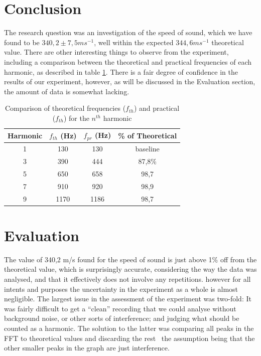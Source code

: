 \documentclass{article}
\begin{document}
\pagebreak
\section*{Conclusion}
The research question was an investigation of the speed of sound, which we have found to be $340,2 \pm 7,5 ms^{-1}$, well within the expected $344,6 ms^{-1}$ theoretical value. There are other interesting things to observe from the experiment, including a comparison between the theoretical and practical frequencies of each harmonic, as described in table \ref{table:TheoreticalXPractical}. There is a fair degree of confidence in the results of our experiment, however, as will be discussed in the Evaluation section, the amount of data is somewhat lacking.
\begin{table}[h!]
	\caption{Comparison of theoretical frequencies ($f_{th}$) and practical ($f_{th}$) for the $n^{th}$ harmonic}
	\label{table:TheoreticalXPractical}
	\begin{tabular}{|c c c c|}
		\hline
		Harmonic & $f_{th}$ (Hz) & $f_{pr}$ (Hz) & \% of Theoretical \\
		\hline
		1 & 130 & 130 & baseline\\
		3 & 390 & 444 & 87,8\%\\
		5 & 650 & 658 & 98,7\\
		7 & 910 & 920 & 98,9\\
		9 & 1170 & 1186 & 98,7\\
		\hline
	\end{tabular}
\end{table}


\section*{Evaluation}
The value of 340,2 m/s found for the speed of sound is just above 1\% off from the theoretical value, which is surprisingly accurate, considering the way the data was analysed, and that it effectively does not involve any repetitions. however for all intents and purposes the uncertainty in the experiment as a whole is almost negligible. The largest issue in the assessment of the experiment was two-fold: It was fairly difficult to get a ``clean'' recording that we could analyse without background noise, or other sorts of interference; and judging what should be counted as a harmonic. The solution to the latter was comparing all peaks in the FFT to theoretical values and discarding the rest \textendash\ the assumption being that the other smaller peaks in the graph are just interference.
\end{document}
